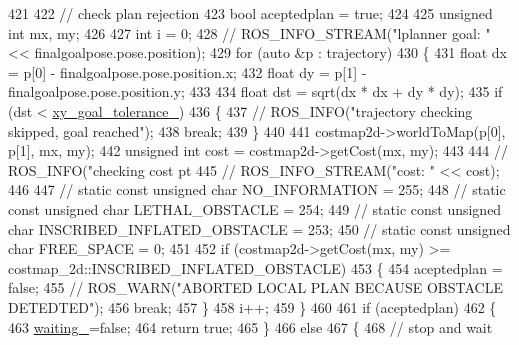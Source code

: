 \begin{DoxyCode}
{421 
422     \textcolor{comment}{// check plan rejection}
423     \textcolor{keywordtype}{bool} aceptedplan = \textcolor{keyword}{true};
424 
425     \textcolor{keywordtype}{unsigned} \textcolor{keywordtype}{int} mx, my;
426 
427     \textcolor{keywordtype}{int} i = 0;
428     \textcolor{comment}{// ROS\_INFO\_STREAM("lplanner goal: " << finalgoalpose.pose.position);}
429     \textcolor{keywordflow}{for} (\textcolor{keyword}{auto} &p : trajectory)
430     \{
431         \textcolor{keywordtype}{float} dx = p[0] - finalgoalpose.pose.position.x;
432         \textcolor{keywordtype}{float} dy = p[1] - finalgoalpose.pose.position.y;
433 
434         \textcolor{keywordtype}{float} dst = sqrt(dx * dx + dy * dy);
435         \textcolor{keywordflow}{if} (dst < \hyperlink{classcl__move__base__z_1_1forward__local__planner_1_1ForwardLocalPlanner_acd2ed91ee166f03faeeb9d6a4b91084b}{xy\_goal\_tolerance\_})
436          \{
437             \textcolor{comment}{//  ROS\_INFO("trajectory checking skipped, goal reached");}
438              \textcolor{keywordflow}{break};
439         \}
440 
441         costmap2d->worldToMap(p[0], p[1], mx, my);
442         \textcolor{keywordtype}{unsigned} \textcolor{keywordtype}{int} cost = costmap2d->getCost(mx, my);
443 
444         \textcolor{comment}{// ROS\_INFO("checking cost pt %
445         \textcolor{comment}{// ROS\_INFO\_STREAM("cost: " << cost);}
446 
447         \textcolor{comment}{// static const unsigned char NO\_INFORMATION = 255;}
448         \textcolor{comment}{// static const unsigned char LETHAL\_OBSTACLE = 254;}
449         \textcolor{comment}{// static const unsigned char INSCRIBED\_INFLATED\_OBSTACLE = 253;}
450         \textcolor{comment}{// static const unsigned char FREE\_SPACE = 0;}
451 
452         \textcolor{keywordflow}{if} (costmap2d->getCost(mx, my) >= costmap\_2d::INSCRIBED\_INFLATED\_OBSTACLE)
453         \{
454             aceptedplan = \textcolor{keyword}{false};
455             \textcolor{comment}{// ROS\_WARN("ABORTED LOCAL PLAN BECAUSE OBSTACLE DETEDTED");}
456             \textcolor{keywordflow}{break};
457         \}
458         i++;
459     \}
460 
461     \textcolor{keywordflow}{if} (aceptedplan)
462     \{
463         \hyperlink{classcl__move__base__z_1_1forward__local__planner_1_1ForwardLocalPlanner_a5061c2aa0d8d2309f1669e402741f0fa}{waiting\_}=\textcolor{keyword}{false};
464         \textcolor{keywordflow}{return} \textcolor{keyword}{true};
465     \}
466     \textcolor{keywordflow}{else}
467     \{
468         \textcolor{comment}{// stop and wait}
}}
\end{DoxyCode}
